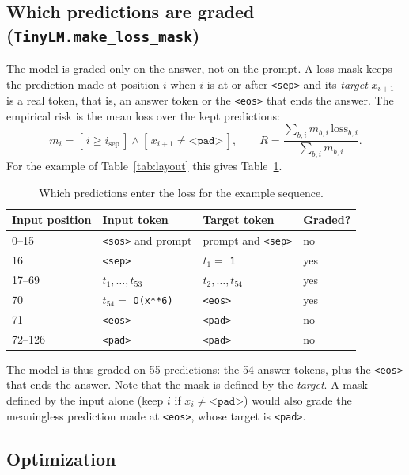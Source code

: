 \documentclass[11pt]{article}
\newcommand{\tok}[1]{\texttt{<#1>}}
\newcommand{\code}[1]{\texttt{#1}}
\begin{document}
\subsection{Which predictions are graded (\code{TinyLM.make\_loss\_mask})}

The model is graded only on the answer, not on the prompt. A loss mask keeps the
prediction made at position $i$ when $i$ is at or after \tok{sep} and its \emph{target}
$x_{i+1}$ is a real token, that is, an answer token or the \tok{eos} that ends the
answer. The empirical risk is the mean loss over the kept predictions:
\begin{equation}
  m_i=[\,i\ge i_{\text{sep}}\,]\wedge[\,x_{i+1}\neq\tok{pad}\,],\qquad
  R=\frac{\sum_{b,i}m_{b,i}\,\mathrm{loss}_{b,i}}{\sum_{b,i}m_{b,i}} .
\end{equation}
For the example of Table~\ref{tab:layout} this gives Table~\ref{tab:graded}.

\begin{table}[h]
\centering\small
\caption{Which predictions enter the loss for the example sequence.}
\label{tab:graded}
\begin{tabular}{@{}llll@{}}
\toprule
Input position & Input token & Target token & Graded? \\
\midrule
0--15 & \tok{sos} and prompt & prompt and \tok{sep} & no \\
16 & \tok{sep} & $t_1=$ \code{1} & yes \\
17--69 & $t_1,\dots,t_{53}$ & $t_2,\dots,t_{54}$ & yes \\
70 & $t_{54}=$ \code{O(x**6)} & \tok{eos} & yes \\
71 & \tok{eos} & \tok{pad} & no \\
72--126 & \tok{pad} & \tok{pad} & no \\
\bottomrule
\end{tabular}
\end{table}

The model is thus graded on 55 predictions: the 54 answer tokens, plus the \tok{eos}
that ends the answer. Note that the mask is defined by the \emph{target}. A mask defined
by the input alone (keep $i$ if $x_i\neq\tok{pad}$) would also grade the meaningless
prediction made at \tok{eos}, whose target is \tok{pad}.

\subsection{Optimization}
\end{document}
